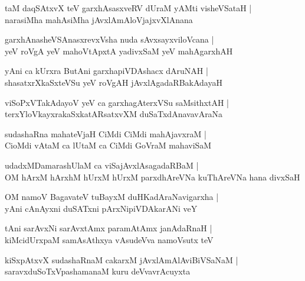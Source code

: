 \documentclass[twoside,12pt,openright]{book}
\newcounter{shloka}[chapter]
\begin{document}
\begin{shloka}%
taM daqSAtxvX teV garxhAsasxveRV dUraM yAMti visheVSataH |\\
narasiMha mahAsiMha jAvxlAmAloVjajxvXlAnana
\end{shloka}

\begin{shloka}%
garxhAnasheVSAnasxrevxVsha nuda sAvxsayxviloVcana |\\
yeV roVgA yeV mahoVtApxtA yadivxSaM yeV mahAgarxhAH 
\end{shloka}

\begin{shloka}%
yAni ca kUrxra ButAni garxhapiVDAshacx dAruNAH |\\
shasatxrXkaSxteVSu yeV roVgAH jAvxlAgadaRBakAdayaH 
\end{shloka}

\begin{shloka}%
viSoPxVTakAdayoV yeV ca garxhagAterxVSu saMsithxtAH |\\
terxYloVkayxrakaSxkatARsatxvXM duSaTxdAnavavAraNa
\end{shloka}

\begin{shloka}%
sudashaRna mahateVjaH CiMdi CiMdi mahAjavxraM |\\
CioMdi vAtaM ca lUtaM ca CiMdi GoVraM mahaviSaM 
\end{shloka}

\begin{shloka}%
udadxMDamarashUlaM ca viSajAvxlAsagadaRBaM |\\
OM hArxM hArxhM hUrxM hUrxM parxdhAreVNa kuThAreVNa hana divxSaH 
\end{shloka}

\begin{shloka}%
OM namoV BagavateV tuBayxM duHKadAraNavigarxha |\\
yAni cAnAyxni duSATxni pArxNipiVDAkarANi veY 
\end{shloka}

\begin{shloka}%
tAni sarAvxNi sarAvxtAmx paramAtAmx janAdaRnaH |\\
kiMcidUrxpaM samAsAthxya vAsudeVva namoVsutx teV 
\end{shloka}

\begin{shloka}%
kiSxpAtxvX sudashaRnaM cakarxM jAvxlAmAlAviBiVSaNaM |\\
saravxduSoTxVpashamanaM kuru deVvavrAcuyxta 
\end{shloka}
\end{document}
